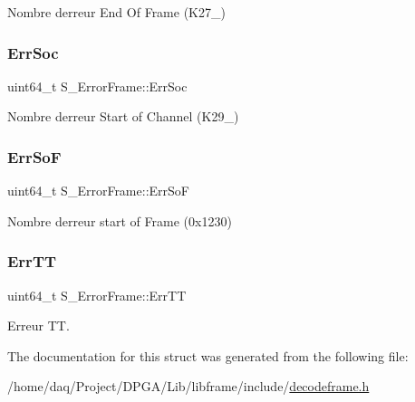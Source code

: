 Nombre d\textquotesingle{}erreur End Of Frame (K27\+\_) 

\mbox{\label{structS__ErrorFrame_a35a6a18bbb7900d93a401c9ddbceb5c1}} 
\subsubsection{\texorpdfstring{Err\+Soc}{ErrSoc}}
{\footnotesize\ttfamily uint64\+\_\+t S\+\_\+\+Error\+Frame\+::\+Err\+Soc}



Nombre d\textquotesingle{}erreur Start of Channel (K29\+\_) 

\mbox{\label{structS__ErrorFrame_afd3ab1e3e1a636c55f90b4aa13fa0629}} 
\subsubsection{\texorpdfstring{Err\+SoF}{ErrSoF}}
{\footnotesize\ttfamily uint64\+\_\+t S\+\_\+\+Error\+Frame\+::\+Err\+SoF}



Nombre d\textquotesingle{}erreur start of Frame (0x1230) 

\mbox{\label{structS__ErrorFrame_a2f37aa2839ebd8571f577130f96a8005}} 
\subsubsection{\texorpdfstring{Err\+TT}{ErrTT}}
{\footnotesize\ttfamily uint64\+\_\+t S\+\_\+\+Error\+Frame\+::\+Err\+TT}



Erreur TT. 



The documentation for this struct was generated from the following file\+:\begin{DoxyCompactItemize}
\item 
/home/daq/\+Project/\+D\+P\+G\+A/\+Lib/libframe/include/\hyperlink{decodeframe_8h}{decodeframe.\+h}\end{DoxyCompactItemize}
